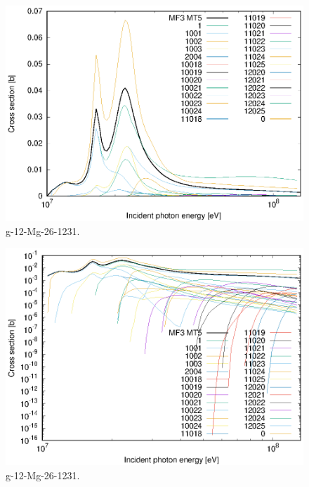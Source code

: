 \begin{figure}
 \includegraphics[width=\linewidth]{eps/g_12-Mg-26_1231.eps}
  \caption{g-12-Mg-26-1231.}
\end{figure}
\begin{figure}
 \includegraphics[width=\linewidth]{eps-log/g_12-Mg-26_1231.eps}
 \caption{g-12-Mg-26-1231.}
\end{figure}
\newpage \clearpage

